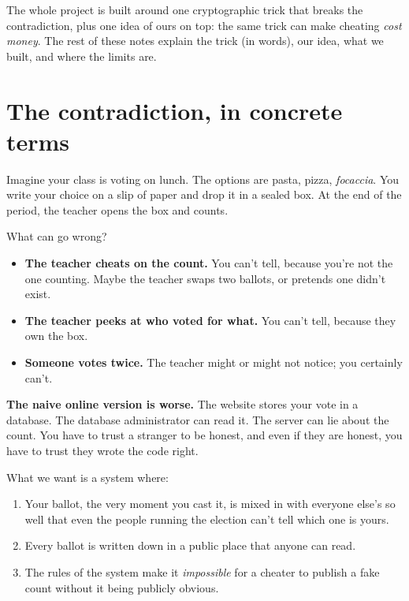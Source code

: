 \documentclass[11pt,a4paper]{article}
\begin{document}
The whole project is built around one cryptographic trick that breaks
the contradiction, plus one idea of ours on top: the same trick can
make cheating \emph{cost money}. The rest of these notes explain the
trick (in words), our idea, what we built, and where the limits are.

\section{The contradiction, in concrete terms}

Imagine your class is voting on lunch. The options are pasta, pizza,
\textit{focaccia}. You write your choice on a slip of paper and drop
it in a sealed box. At the end of the period, the teacher opens the
box and counts.

What can go wrong?

\begin{itemize}[leftmargin=*]
  \item \textbf{The teacher cheats on the count.} You can't tell, because
        you're not the one counting. Maybe the teacher swaps two
        ballots, or pretends one didn't exist.
  \item \textbf{The teacher peeks at who voted for what.} You can't tell,
        because they own the box.
  \item \textbf{Someone votes twice.} The teacher might or might not
        notice; you certainly can't.
\end{itemize}

\textbf{The naive online version is worse.} The website stores your
vote in a database. The database administrator can read it. The server
can lie about the count. You have to trust a stranger to be honest, and
even if they are honest, you have to trust they wrote the code right.

What we want is a system where:

\begin{enumerate}[leftmargin=*]
  \item Your ballot, the very moment you cast it, is mixed in with
        everyone else's so well that even the people running the
        election can't tell which one is yours.
  \item Every ballot is written down in a public place that anyone
        can read.
  \item The rules of the system make it \emph{impossible} for a
        cheater to publish a fake count without it being publicly
        obvious.
\end{enumerate}
\end{document}

